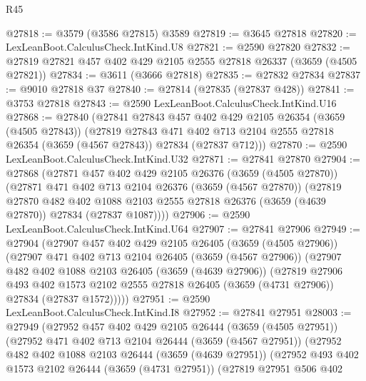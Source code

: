 \begin{lexlean}{R45}
\begin{coremodule}
@27818 := @3579 (@3586 @27815) @3589
@27819 := @3645 @27818
@27820 := LexLeanBoot.CalculusCheck.IntKind.U8
@27821 := @2590 @27820
@27832 := @27819 @27821 @457 @402 @429 @2105 @2555 @27818 @26337 (@3659 (@4505 @27821))
@27834 := @3611 (@3666 @27818)
@27835 := @27832 @27834
@27837 := @9010 @27818 @37
@27840 := @27814 (@27835 (@27837 @428))
@27841 := @3753 @27818
@27843 := @2590 LexLeanBoot.CalculusCheck.IntKind.U16
@27868 := @27840
    (@27841
      @27843
      @457
      @402
      @429
      @2105
      @26354
      (@3659 (@4505 @27843))
      (@27819
        @27843
        @471
        @402
        @713
        @2104
        @2555
        @27818
        @26354
        (@3659 (@4567 @27843))
        @27834
        (@27837 @712)))
@27870 := @2590 LexLeanBoot.CalculusCheck.IntKind.U32
@27871 := @27841 @27870
@27904 := @27868
    (@27871
      @457
      @402
      @429
      @2105
      @26376
      (@3659 (@4505 @27870))
      (@27871
        @471
        @402
        @713
        @2104
        @26376
        (@3659 (@4567 @27870))
        (@27819
          @27870
          @482
          @402
          @1088
          @2103
          @2555
          @27818
          @26376
          (@3659 (@4639 @27870))
          @27834
          (@27837 @1087))))
@27906 := @2590 LexLeanBoot.CalculusCheck.IntKind.U64
@27907 := @27841 @27906
@27949 := @27904
    (@27907
      @457
      @402
      @429
      @2105
      @26405
      (@3659 (@4505 @27906))
      (@27907
        @471
        @402
        @713
        @2104
        @26405
        (@3659 (@4567 @27906))
        (@27907
          @482
          @402
          @1088
          @2103
          @26405
          (@3659 (@4639 @27906))
          (@27819
            @27906
            @493
            @402
            @1573
            @2102
            @2555
            @27818
            @26405
            (@3659 (@4731 @27906))
            @27834
            (@27837 @1572)))))
@27951 := @2590 LexLeanBoot.CalculusCheck.IntKind.I8
@27952 := @27841 @27951
@28003 := @27949
    (@27952
      @457
      @402
      @429
      @2105
      @26444
      (@3659 (@4505 @27951))
      (@27952
        @471
        @402
        @713
        @2104
        @26444
        (@3659 (@4567 @27951))
        (@27952
          @482
          @402
          @1088
          @2103
          @26444
          (@3659 (@4639 @27951))
          (@27952
            @493
            @402
            @1573
            @2102
            @26444
            (@3659 (@4731 @27951))
            (@27819
              @27951
              @506
              @402

\end{coremodule}
\end{lexlean}
